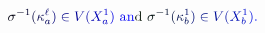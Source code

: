 \documentclass[12pt]{article}
\begin{document}
\makeatletter
\renewcommand*{\@textcolor}[3]{%
  \protect\leavevmode
  \begingroup
    \color#1{#2}#3%
  \endgroup
}
\makeatother
\begin{displaymath}
\mathcolor[RGB]{0,0,15}{\sigma} ^ { \mathcolor[RGB]{0,0,30}{-} \mathcolor[RGB]{0,0,45}{1} } \mathcolor[RGB]{0,0,60}{(} \mathcolor[RGB]{0,0,75}{\kappa} _ { \mathcolor[RGB]{0,0,90}{a} } ^ { \mathcolor[RGB]{0,0,105}{\ell} } \mathcolor[RGB]{0,0,120}{)} \mathcolor[RGB]{0,0,135}{\in} \mathcolor[RGB]{0,0,150}{V} \mathcolor[RGB]{0,0,165}{(} \mathcolor[RGB]{0,0,180}{X} _ { \mathcolor[RGB]{0,0,195}{a} } ^ { \mathcolor[RGB]{0,0,210}{1} } \mathcolor[RGB]{0,0,225}{)} \mathrm { ~ \mathcolor[RGB]{0,0,240}{a} \mathcolor[RGB]{0,0,255}{n} \mathcolor[RGB]{0,15,0}{d} ~ } \mathcolor[RGB]{0,15,15}{\sigma} ^ { \mathcolor[RGB]{0,15,30}{-} \mathcolor[RGB]{0,15,45}{1} } \mathcolor[RGB]{0,15,60}{(} \mathcolor[RGB]{0,15,75}{\kappa} _ { \mathcolor[RGB]{0,15,90}{b} } ^ { \mathcolor[RGB]{0,15,105}{1} } \mathcolor[RGB]{0,15,120}{)} \mathcolor[RGB]{0,15,135}{\in} \mathcolor[RGB]{0,15,150}{V} \mathcolor[RGB]{0,15,165}{(} \mathcolor[RGB]{0,15,180}{X} _ { \mathcolor[RGB]{0,15,195}{b} } ^ { \mathcolor[RGB]{0,15,210}{1} } \mathcolor[RGB]{0,15,225}{)} \mathcolor[RGB]{0,15,240}{.}
\end{displaymath}
\end{document}
